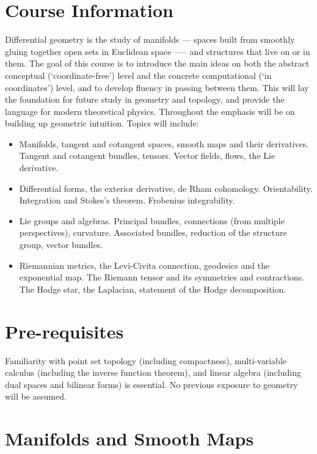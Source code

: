\documentclass[a4paper,11pt]{article}
\begin{document}
	\maketitlepage
	\preliminaries

	\section*{Course Information}

	Differential geometry is the study of manifolds --- spaces built from smoothly gluing together open sets in Euclidean space —-- and structures that live on or in them. The goal of this course is to introduce the main ideas on both the abstract conceptual (‘coordinate-free’) level and the concrete computational (‘in coordinates’) level, and to develop fluency in passing between them. This will lay the foundation for future study in geometry and topology, and provide the language for modern theoretical physics. Throughout the emphasis will be on building up geometric intuition. Topics will include:


	\begin{itemize}
		\item Manifolds, tangent and cotangent spaces, smooth maps and their derivatives. Tangent and cotangent bundles, tensors. Vector fields, flows, the Lie derivative.
		\item Differential forms, the exterior derivative, de Rham cohomology. Orientability. Integration and Stokes’s theorem. Frobenius integrability.
		\item Lie groups and algebras. Principal bundles, connections (from multiple perspectives), curvature. Associated bundles, reduction of the structure group, vector bundles.
		\item Riemannian metrics, the Levi-Civita connection, geodesics and the exponential map. The Riemann tensor and its symmetries and contractions. The Hodge star, the Laplacian, statement of the Hodge decomposition.
	\end{itemize}

	
	\section*{Pre-requisites}
	
	Familiarity with point set topology (including compactness), multi-variable calculus (including the inverse function theorem), and linear algebra (including dual spaces and bilinear forms) is essential. No previous exposure to geometry will be assumed.

	\newpage
	\tableofcontents
	\newpage
	\maintext
	\section{Manifolds and Smooth Maps}
\end{document}
